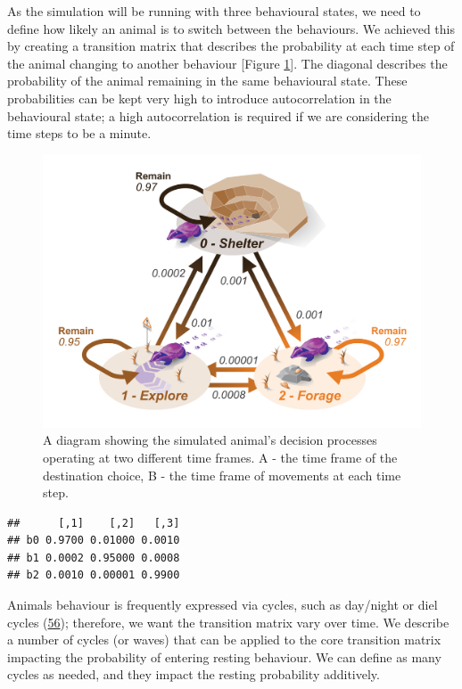 \documentclass[10pt,a4paper]{article}
\begin{document}
As the simulation will be running with three behavioural states, we need to define how likely an animal is to switch between the behaviours.
We achieved this by creating a transition matrix that describes the probability at each time step of the animal changing to another behaviour {[}Figure \ref{fig:transMatrixDiagram}{]}.
The diagonal describes the probability of the animal remaining in the same behavioural state.
These probabilities can be kept very high to introduce autocorrelation in the behavioural state; a high autocorrelation is required if we are considering the time steps to be a minute.

\begin{figure}

{\centering \includegraphics[width=0.8\linewidth]{../ext_figures/Tranistion Matrix Diagram} 

}

\caption{A diagram showing the simulated animal's decision processes operating at two different time frames. A - the time frame of the destination choice, B - the time frame of movements at each time step.}\label{fig:transMatrixDiagram}
\end{figure}

\begin{verbatim}
##      [,1]    [,2]   [,3]
## b0 0.9700 0.01000 0.0010
## b1 0.0002 0.95000 0.0008
## b2 0.0010 0.00001 0.9900
\end{verbatim}

Animals behaviour is frequently expressed via cycles, such as day/night or diel cycles (\protect\hyperlink{ref-rivera_rethinking_2022}{56}); therefore, we want the transition matrix vary over time.
We describe a number of cycles (or waves) that can be applied to the core transition matrix impacting the probability of entering resting behaviour.
We can define as many cycles as needed, and they impact the resting probability additively.
\end{document}
